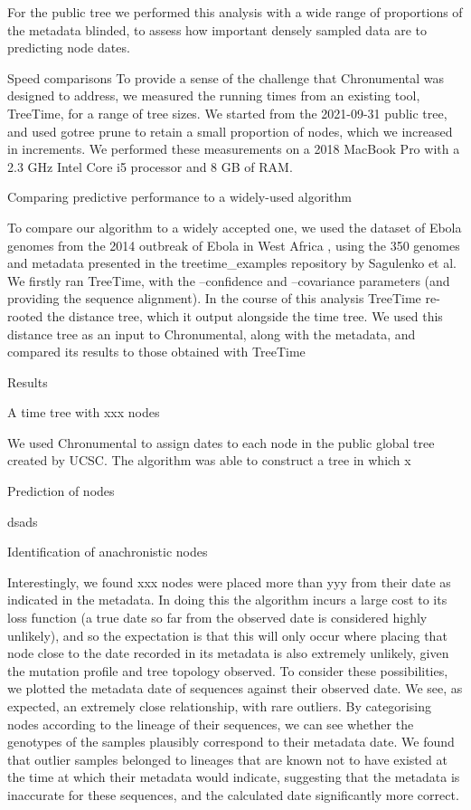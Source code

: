 For the public tree we performed this analysis with a wide range of proportions of the metadata blinded, to assess how important densely sampled data are to predicting node dates.

Speed comparisons
To provide a sense of the challenge that Chronumental was designed to address, we measured the running times from an existing tool, TreeTime, for a range of tree sizes. We started from the 2021-09-31 public tree, and used gotree prune to retain a small proportion of nodes, which we increased in increments. We performed these measurements on a 2018 MacBook Pro with a 2.3 GHz Intel Core i5 processor and 8 GB of RAM.


Comparing predictive performance to a widely-used algorithm

To compare our algorithm  to a widely accepted one, we used the dataset of Ebola genomes from the 2014 outbreak of Ebola in West Africa  \cite{Dudas2017-km}, using the 350 genomes and metadata presented in the treetime_examples repository by Sagulenko et al. We firstly ran TreeTime, with the --confidence and --covariance parameters (and providing the sequence alignment). In the course of this analysis TreeTime re-rooted the distance tree, which it output alongside the time tree. We used this distance tree as an input to Chronumental, along with the metadata, and compared its results to those obtained with TreeTime


Results

A time tree with xxx nodes

We used Chronumental to assign dates to each node in the public global tree created by UCSC. The algorithm was able to construct a tree in which x%

Prediction of nodes

dsads

Identification of anachronistic nodes

Interestingly, we found xxx nodes were placed more than yyy from their date as indicated in the metadata. In doing this the algorithm incurs a large cost to its loss function (a true date so far from the observed date is considered highly unlikely), and so the expectation is that this will only occur where placing that node close to the date recorded in its metadata is also extremely unlikely, given the mutation profile and tree topology observed. To consider these possibilities, we plotted the metadata date of sequences against their observed date. We see, as expected, an extremely close relationship, with rare outliers. By categorising nodes according to the lineage of their sequences, we can see whether the genotypes of the samples plausibly correspond to their metadata date. We found that outlier samples belonged to lineages that are known not to have existed at the time at which their metadata would indicate, suggesting that the metadata is inaccurate for these sequences, and the calculated date significantly more correct. 

